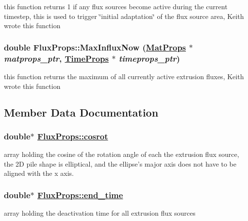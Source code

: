 this function returns 1 if any flux sources become active during the current timestep, this is used to trigger \char`\"{}initial adaptation\char`\"{} of the flux source area, Keith wrote this function 

\hypertarget{structFluxProps_a3}{
\subsubsection[MaxInfluxNow]{\setlength{\rightskip}{0pt plus 5cm}double Flux\-Props::Max\-Influx\-Now (\hyperlink{structMatProps}{Mat\-Props} $\ast$ {\em matprops\_\-ptr}, \hyperlink{structTimeProps}{Time\-Props} $\ast$ {\em timeprops\_\-ptr})}}
\label{structFluxProps_a3}


this function returns the maximum of all currently active extrusion fluxes, Keith wrote this function 



\subsection{Member Data Documentation}
\hypertarget{structFluxProps_o8}{
\subsubsection[cosrot]{\setlength{\rightskip}{0pt plus 5cm}double$\ast$ \hyperlink{structFluxProps_o8}{Flux\-Props::cosrot}}}
\label{structFluxProps_o8}


array holding the cosine of the rotation angle of each the extrusion flux source, the 2D pile shape is elliptical, and the ellipse's major axis does not have to be aligned with the x axis. 

\hypertarget{structFluxProps_o3}{
\subsubsection[end\_\-time]{\setlength{\rightskip}{0pt plus 5cm}double$\ast$ \hyperlink{structFluxProps_o3}{Flux\-Props::end\_\-time}}}
\label{structFluxProps_o3}


array holding the deactivation time for all extrusion flux sources 

